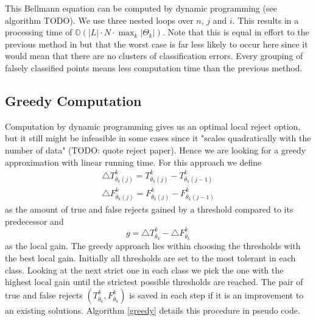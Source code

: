 This Bellmann equation can be computed by dynamic programming (see algorithm TODO). We use three nested loops over $n$, $j$ and $i$. This results in a processing time of $\mathbb{O}(|L| \cdot N \cdot \max_k \left|\Theta_k\right|)$. 
Note that this is equal in effort to the previous method in \cite{Fis:2015} but that the worst case is far less likely to occur here since it would mean that there are no clusters of classification errors. Every grouping of falsely classified points means less computation time than the previous method.

\subsection{Greedy Computation}
\label{greedyAlg}
Computation by dynamic programming gives us an optimal local reject option, but it still might be infeasible in some cases since it "scales quadratically with the number of data" (TODO: quote reject paper). Hence we are looking for a greedy approximation with linear running time. For this approach we define
\begin{align}
 	\bigtriangleup T_{\bar{\theta}_k(j)}^k = T_{\bar{\theta}_k(j)}^k-T_{\bar{\theta}_k(j-1)}^k \\
	\bigtriangleup F_{\bar{\theta}_k(j)}^k = F_{\bar{\theta}_k(j)}^k-F_{\bar{\theta}_k(j-1)}^k
\end{align}
as the amount of true and false rejects gained by a threshold compared to its predecessor and
$$ g = \bigtriangleup T_{\bar{\theta}_k}^k - \bigtriangleup F_{\bar{\theta}_k}^k $$
as the local gain. The greedy approach lies within choosing the thresholds with the best local gain. Initially all thresholds are set to the most tolerant in each class. Looking at the next strict one in each class we pick the one with the highest local gain until the strictest possible thresholds are reached. The pair of true and false rejects $\left(T_{\bar{\theta}_k}^k,F_{\bar{\theta}_k}^k\right)$ is saved in each step if it is an improvement to an existing solutions. Algorithm \ref{greedy} details this procedure in pseudo code. 


